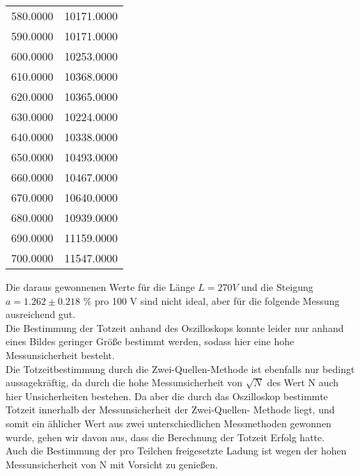 \begin{table}[H]
\begin{tabular}{c c}
    580.0000 & 10171.0000 \\   
    590.0000 & 10171.0000 \\   
    600.0000 & 10253.0000 \\   
    610.0000 & 10368.0000 \\   
    620.0000 & 10365.0000 \\   
    630.0000 & 10224.0000 \\   
    640.0000 & 10338.0000 \\   
    650.0000 & 10493.0000 \\   
    660.0000 & 10467.0000 \\   
    670.0000 & 10640.0000 \\
    680.0000 & 10939.0000 \\   
    690.0000 & 11159.0000 \\
    700.0000 & 11547.0000 \\ 
    \bottomrule
  \end{tabular}
\end{table}
\noindent Die daraus gewonnenen Werte für die Länge $L= 270 V$ und die Steigung $a = 1.262 \pm 0.218$ \% 
pro 100 V sind nicht ideal, aber für die folgende Messung ausreichend gut. \\
Die Bestimmung der Totzeit anhand des Oszilloskops konnte leider nur anhand eines Bildes 
geringer Größe bestimmt werden, sodass hier eine hohe Messunsicherheit besteht.\\
Die Totzeitbestimmung durch die Zwei-Quellen-Methode ist ebenfalls nur bedingt aussagekräftig,
da durch die hohe Messunsicherheit von $\sqrt{N}$ des Wert N auch hier Unsicherheiten bestehen.
Da aber die durch das Oszilloskop bestimmte Totzeit innerhalb der Messunsicherheit der Zwei-Quellen-
Methode liegt, und somit ein ählicher Wert aus zwei unterschiedlichen Messmethoden gewonnen 
wurde, gehen wir davon aus, dass die Berechnung der Totzeit Erfolg hatte.\\
Auch die Bestimmung der pro Teilchen freigesetzte Ladung ist wegen der hohen Messunsicherheit von 
N mit Vorsicht zu genießen.
